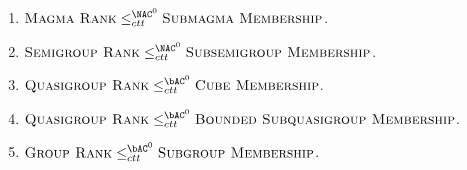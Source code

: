 \begin{lemma}\label{lem:ranktomem}
  \mbox{}
  \begin{enumerate}
  \item $\textsc{Magma Rank} \leq^{\NAC^0}_{ctt} \textsc{Submagma Membership}$.
  \item $\textsc{Semigroup Rank} \leq^{\NAC^0}_{ctt} \textsc{Subsemigroup Membership}$.
  \item $\textsc{Quasigroup Rank} \leq^{\bAC^0}_{ctt} \textsc{Cube Membership}$.
  \item $\textsc{Quasigroup Rank} \leq^{\bAC^0}_{ctt} \textsc{Bounded Subquasigroup Membership}$.
  \item $\textsc{Group Rank} \leq^{\bAC^0}_{ctt} \textsc{Subgroup Membership}$.
  \end{enumerate}
\end{lemma}
